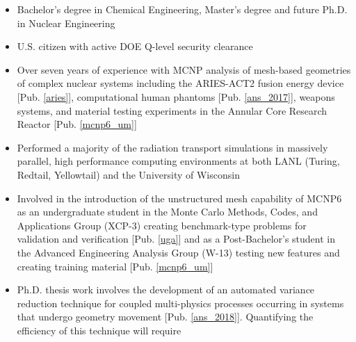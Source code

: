 \begin{center}
\begin{minipage}{\textwidth}
\begin{itemize}[leftmargin=.875in,rightmargin=.75in,itemsep=1.0mm]
               \item Bachelor's degree in Chemical Engineering, Master's degree
		       and future Ph.D. in Nuclear Engineering
               \item U.S. citizen with active DOE Q-level security clearance 
                \item Over seven years of experience with MCNP analysis of
			mesh-based geometries of complex nuclear
		      systems including the ARIES-ACT2 fusion energy device
		      [Pub. \ref{aries}],
		      computational human phantoms
		      [Pub. \ref{ans_2017}], weapons systems, and material testing
		      experiments in the
		      Annular Core Research Reactor [Pub.
		      \ref{mcnp6_um}]
               \item Performed a majority of the radiation transport simulations 
                     in massively parallel, high performance computing 
                     environments at both LANL (Turing, Redtail, Yellowtail) 
                     and the University of Wisconsin 
	       \item Involved in the introduction of the unstructured mesh capability
                     of MCNP6 as an undergraduate student in the Monte Carlo Methods, 
                     Codes, and Applications Group (XCP-3)
                     creating benchmark-type problems for validation and
		     verification [Pub. \ref{uga}] and as a Post-Bachelor's 
                     student in the Advanced Engineering Analysis Group (W-13) 
                     testing new features and creating training material
                     [Pub. \ref{mcnp6_um}]
	       \item Ph.D. thesis work involves the development of an automated variance reduction technique for
		       coupled multi-physics processes occurring in 
		       systems that undergo geometry movement
                       [Pub. \ref{ans_2018}].  
                       Quantifying the efficiency of this technique will require

\end{itemize}
\end{minipage}
\end{center}
